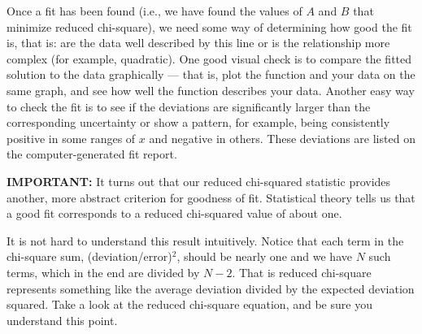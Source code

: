 Once a fit has been found (i.e., we have found  the values of $A$ and $B$
that minimize reduced chi-square), we need some way of determining
how good the fit is, that is: are the data well described by this line
or is the relationship more complex (for example, quadratic).
One good visual check is to compare the fitted
solution to the data graphically --- that is, plot the function and
your data on the same graph, and see how well the function
describes your data.  Another easy way to check the fit is to see
if the deviations %
are significantly
larger than the corresponding uncertainty or show a pattern, for example, being
consistently positive in some ranges of $x$ and negative in others.  These deviations are listed on the 
computer-generated fit report.

{\bf IMPORTANT:}  \label{par:chi_square} It turns out that our reduced chi-squared statistic
provides another, more abstract criterion for goodness of fit.
Statistical theory tells us that a good fit corresponds to a reduced
chi-squared value of about one.  

It is not hard to understand this result intuitively.
Notice that each term in the chi-square sum, (deviation/error)${}^2$,
should be nearly one and we have $N$ such terms, which in the end
are divided by $N-2$.
That is reduced chi-square represents something like the average
deviation divided by the expected deviation squared.  
Take a look at the reduced chi-square equation, and be sure you understand
this point.  

